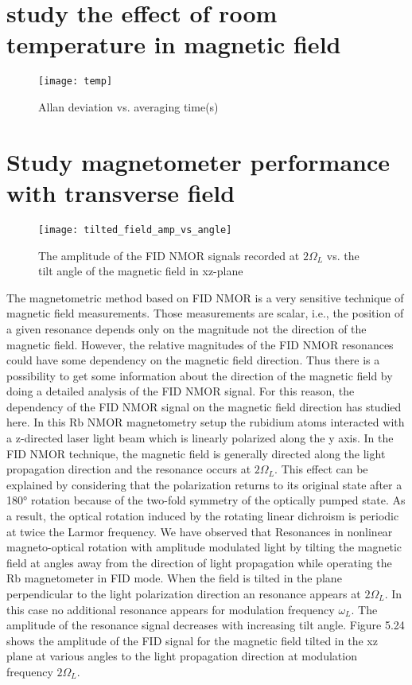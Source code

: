 \documentclass[12pt]{report}
\begin{document}
  \section{study the effect of room temperature in magnetic field} 
  \begin{figure}[h]
\centering\texttt{[image: temp]}
\caption{Allan deviation vs. averaging time(s)}
\end{figure}
\newpage
   \section{Study magnetometer performance with transverse field}  
   
\begin{figure}[h]
\centering\texttt{[image: tilted\_field\_amp\_vs\_angle]}
\caption{The amplitude of the FID NMOR signals recorded at $2\Omega_L$ vs. the tilt angle of the magnetic field in xz-plane}
\end{figure}
 The magnetometric method based on FID NMOR is a very sensitive technique of magnetic field measurements. Those measurements are scalar, i.e., the position of a given resonance depends only on the magnitude not the direction of the magnetic field. However, the relative magnitudes of the FID NMOR resonances could have some dependency on the magnetic field direction. Thus there is a possibility to get some information about the direction of the magnetic field by doing a detailed analysis of the FID NMOR signal.  For this reason, the dependency of the FID NMOR signal on the magnetic field direction has studied here.  In this Rb NMOR magnetometry setup the rubidium atoms interacted with a z-directed laser light beam which is linearly polarized
along the y axis. In the FID NMOR technique, the magnetic field is generally directed along the light propagation direction and the resonance occurs at $2\Omega_L$.  This effect can be explained by considering that the polarization returns to its original state after a 180° rotation because of the two-fold symmetry of the optically pumped state. As a result, the optical rotation induced by the rotating linear dichroism is periodic at twice the Larmor frequency.
We have observed that Resonances in nonlinear magneto-optical rotation with amplitude modulated light by tilting the magnetic field at angles away from the direction of light propagation while operating the Rb magnetometer in FID mode. When the field is tilted in the plane perpendicular to the light polarization direction an resonance appears at $2\Omega_L$. In this case no additional resonance appears for modulation frequency $\omega_L$. The amplitude of the resonance signal decreases with increasing tilt angle. Figure 5.24 shows the amplitude of the FID signal for the magnetic field tilted in the xz plane at various angles to the light propagation direction at modulation frequency $2\Omega_L$.
\end{document}
